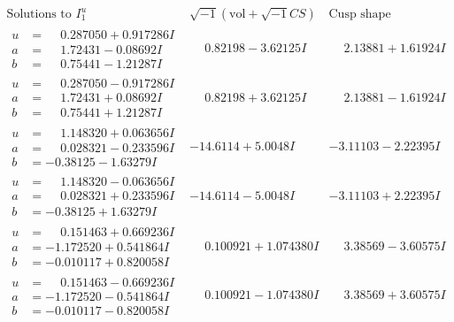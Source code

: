 \documentclass[1p]{elsarticle_modified}
\theoremstyle{definition}
\newcommand{\I}{\sqrt{-1}}
\begin{document}
$$\begin{array}{c|c|c}  
\text{Solutions to }I^u_{1}& \I (\text{vol} + \sqrt{-1}CS) & \text{Cusp shape}\\
 \hline 
\begin{aligned}
u &= \phantom{-}0.287050 + 0.917286 I \\
a &= \phantom{-}1.72431 - 0.08692 I \\
b &= \phantom{-}0.75441 - 1.21287 I\end{aligned}
 & \phantom{-}0.82198 - 3.62125 I & \phantom{-}2.13881 + 1.61924 I \\ \hline\begin{aligned}
u &= \phantom{-}0.287050 - 0.917286 I \\
a &= \phantom{-}1.72431 + 0.08692 I \\
b &= \phantom{-}0.75441 + 1.21287 I\end{aligned}
 & \phantom{-}0.82198 + 3.62125 I & \phantom{-}2.13881 - 1.61924 I \\ \hline\begin{aligned}
u &= \phantom{-}1.148320 + 0.063656 I \\
a &= \phantom{-}0.028321 - 0.233596 I \\
b &= -0.38125 - 1.63279 I\end{aligned}
 & -14.6114 + 5.0048 I & -3.11103 - 2.22395 I \\ \hline\begin{aligned}
u &= \phantom{-}1.148320 - 0.063656 I \\
a &= \phantom{-}0.028321 + 0.233596 I \\
b &= -0.38125 + 1.63279 I\end{aligned}
 & -14.6114 - 5.0048 I & -3.11103 + 2.22395 I \\ \hline\begin{aligned}
u &= \phantom{-}0.151463 + 0.669236 I \\
a &= -1.172520 + 0.541864 I \\
b &= -0.010117 + 0.820058 I\end{aligned}
 & \phantom{-}0.100921 + 1.074380 I & \phantom{-}3.38569 - 3.60575 I \\ \hline\begin{aligned}
u &= \phantom{-}0.151463 - 0.669236 I \\
a &= -1.172520 - 0.541864 I \\
b &= -0.010117 - 0.820058 I\end{aligned}
 & \phantom{-}0.100921 - 1.074380 I & \phantom{-}3.38569 + 3.60575 I \\ \hline\begin{aligned}

\end{aligned}
\end{array}$$
\end{document}
